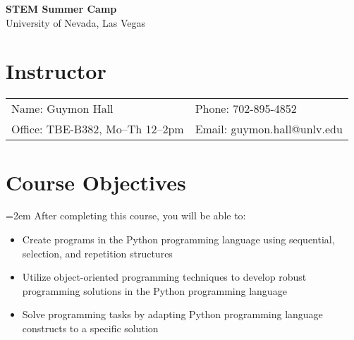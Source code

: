\documentclass{article}
\begin{document}
    \thispagestyle{empty}

    \begin{center}
        \textbf{STEM Summer Camp} \\
        University of Nevada, Las Vegas \\ 
    \end{center}

    \section*{Instructor}

        \vspace{-1em}

        \setlength{\tabcolsep}{1.5em}

        \begin{center}\begin{tabular}{p{} p{}}

            Name: Guymon Hall & Phone: 702-895-4852 \\
            Office: TBE-B382, Mo--Th 12--2pm & Email: guymon.hall@unlv.edu \\

        \end{tabular}\end{center}

        \vspace{-1.25em}

    \section*{Course Objectives}

        \hangindent=2em \indent After completing this course, you will
        be able to:

        \begin{itemize}[leftmargin=4em]

            \item Create programs in the Python programming language using
                sequential, selection, and repetition structures

            \item Utilize object-oriented programming techniques to
                develop robust programming solutions in the Python
                programming language

            \item Solve programming tasks by adapting Python programming
                language constructs to a specific solution

        \end{itemize}
        
\end{document}
